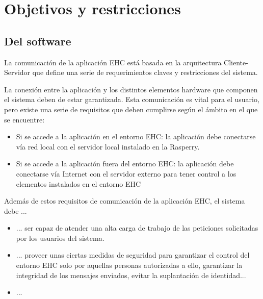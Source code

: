 \chapter{Objetivos y restricciones}

\section{Del software}

La comunicación de la aplicación EHC está basada en la arquitectura Cliente-Servidor que define una serie de requerimientos claves y restricciones del sistema. 

La conexión entre la aplicación y los distintos elementos hardware que componen el sistema deben de estar garantizada. Esta comunicación es vital para el usuario, pero existe una serie de requisitos que deben cumplirse seg\'un el ámbito en el que se encuentre:
\begin{itemize}
\item Si se accede a la aplicación en el entorno EHC: la aplicación debe conectarse vía red local con el servidor local instalado en la Rasperry.
\item Si se accede a la aplicación fuera del entorno EHC: la aplicación debe conectarse vía Internet con el servidor externo para tener control a los elementos instalados en el entorno EHC
\end{itemize}

Además de estos requisitos de comunicación de la aplicación EHC, el sistema debe ...
\begin{itemize}
\item ... ser capaz de atender una alta carga de trabajo de las peticiones solicitadas por los usuarios del sistema.
\item ... proveer unas ciertas medidas de seguridad para garantizar el control del entorno EHC solo por aquellas personas autorizadas a ello, garantizar la integridad de los mensajes enviados, evitar la suplantación de identidad...
\item ...
\end{itemize}

